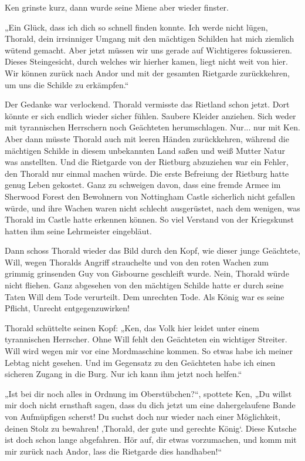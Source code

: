 Ken grinste kurz, dann wurde seine Miene aber wieder finster.

„Ein Glück, dass ich dich so schnell finden konnte. Ich werde nicht lügen, Thorald, dein irrsinniger Umgang mit den mächtigen Schilden hat mich ziemlich wütend gemacht. Aber jetzt müssen wir uns gerade auf Wichtigeres fokussieren. Dieses Steingesicht, durch welches wir hierher kamen, liegt nicht weit von hier. Wir können zurück nach Andor und mit der gesamten Rietgarde zurückkehren, um uns die Schilde zu erkämpfen.“

Der Gedanke war verlockend. Thorald vermisste das Rietland schon jetzt. Dort könnte er sich endlich wieder sicher fühlen. Saubere Kleider anziehen. Sich weder mit tyrannischen Herrschern noch Geächteten herumschlagen. Nur... nur mit Ken. Aber dann müsste Thorald auch mit leeren Händen zurückkehren, während die mächtigen Schilde in diesem unbekannten Land saßen und weiß Mutter Natur was anstellten. Und die Rietgarde von der Rietburg abzuziehen war ein Fehler, den Thorald nur einmal machen würde. Die erste Befreiung der Rietburg hatte genug Leben gekostet. Ganz zu schweigen davon, dass eine fremde Armee im Sherwood Forest den Bewohnern von Nottingham Castle sicherlich nicht gefallen würde, und ihre Wachen waren nicht schlecht ausgerüstet, nach dem wenigen, was Thorald im Castle hatte erkennen können. So viel Verstand von der Kriegskunst hatten ihm seine Lehrmeister eingebläut.

Dann schoss Thorald wieder das Bild durch den Kopf, wie dieser junge Geächtete, Will, wegen Thoralds Angriff strauchelte und von den roten Wachen zum grimmig grinsenden Guy von Gisbourne geschleift wurde. Nein, Thorald würde nicht fliehen. Ganz abgesehen von den mächtigen Schilde hatte er durch seine Taten Will dem Tode verurteilt. Dem unrechten Tode. Als König war es seine Pflicht, Unrecht entgegenzuwirken!

Thorald schüttelte seinen Kopf: „Ken, das Volk hier leidet unter einem tyrannischen Herrscher. Ohne Will fehlt den Geächteten ein wichtiger Streiter. Will wird wegen mir vor eine Mordmaschine kommen. So etwas habe ich meiner Lebtag nicht gesehen. Und im Gegensatz zu den Geächteten habe ich einen sicheren Zugang in die Burg. Nur ich kann ihm jetzt noch helfen.“

„Ist bei dir noch alles in Ordnung im Oberstübchen?“, spottete Ken, „Du willst mir doch nicht ernsthaft sagen, dass du dich jetzt um eine dahergelaufene Bande von Aufmüpfigen scherst! Du suchst doch nur wieder nach einer Möglichkeit, deinen Stolz zu bewahren! ‚Thorald, der gute und gerechte König‘. Diese Kutsche ist doch schon lange abgefahren. Hör auf, dir etwas vorzumachen, und komm mit mir zurück nach Andor, lass die Rietgarde dies handhaben!“

